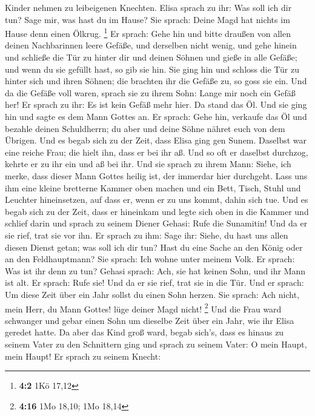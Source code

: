 Kinder nehmen zu leibeigenen Knechten.  Elisa sprach zu ihr:
Was soll ich dir tun? Sage mir, was hast du im Hause? Sie sprach: Deine
Magd hat nichts im Hause denn einen Ölkrug. \footnote{\textbf{4:2} 1Kö
  17,12}  Er sprach: Gehe hin und bitte draußen von allen
deinen Nachbarinnen leere Gefäße, und derselben nicht wenig,
 und gehe hinein und schließe die Tür zu hinter dir und
deinen Söhnen und gieße in alle Gefäße; und wenn du sie gefüllt hast, so
gib sie hin.  Sie ging hin und schloss die Tür zu hinter
sich und ihren Söhnen; die brachten ihr die Gefäße zu, so goss sie ein.
 Und da die Gefäße voll waren, sprach sie zu ihrem Sohn:
Lange mir noch ein Gefäß her! Er sprach zu ihr: Es ist kein Gefäß mehr
hier. Da stand das Öl.  Und sie ging hin und sagte es dem
Mann Gottes an. Er sprach: Gehe hin, verkaufe das Öl und bezahle deinen
Schuldherrn; du aber und deine Söhne nähret euch von dem Übrigen.
 Und es begab sich zu der Zeit, dass Elisa ging gen Sunem.
Daselbst war eine reiche Frau; die hielt ihn, dass er bei ihr aß. Und so
oft er daselbst durchzog, kehrte er zu ihr ein und aß bei ihr.
 Und sie sprach zu ihrem Mann: Siehe, ich merke, dass dieser
Mann Gottes heilig ist, der immerdar hier durchgeht.  Lass
uns ihm eine kleine bretterne Kammer oben machen und ein Bett, Tisch,
Stuhl und Leuchter hineinsetzen, auf dass er, wenn er zu uns kommt,
dahin sich tue.  Und es begab sich zu der Zeit, dass er
hineinkam und legte sich oben in die Kammer und schlief darin
 und sprach zu seinem Diener Gehasi: Rufe die Sunamitin!
Und da er sie rief, trat sie vor ihn.  Er sprach zu ihm:
Sage ihr: Siehe, du hast uns allen diesen Dienst getan; was soll ich dir
tun? Hast du eine Sache an den König oder an den Feldhauptmann? Sie
sprach: Ich wohne unter meinem Volk.  Er sprach: Was ist
ihr denn zu tun? Gehasi sprach: Ach, sie hat keinen Sohn, und ihr Mann
ist alt.  Er sprach: Rufe sie! Und da er sie rief, trat sie
in die Tür.  Und er sprach: Um diese Zeit über ein Jahr
sollst du einen Sohn herzen. Sie sprach: Ach nicht, mein Herr, du Mann
Gottes! lüge deiner Magd nicht! \footnote{\textbf{4:16} 1Mo 18,10; 1Mo
  18,14}  Und die Frau ward schwanger und gebar einen Sohn
um dieselbe Zeit über ein Jahr, wie ihr Elisa geredet hatte.
 Da aber das Kind groß ward, begab sich's, dass es hinaus
zu seinem Vater zu den Schnittern ging  und sprach zu
seinem Vater: O mein Haupt, mein Haupt! Er sprach zu seinem Knecht:
